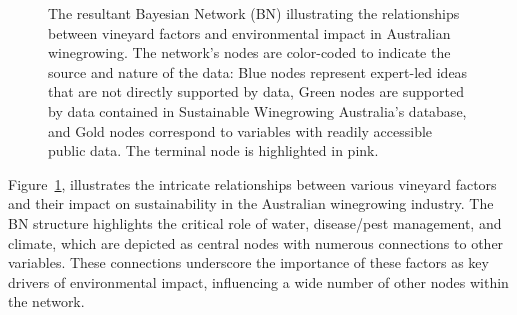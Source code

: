 \documentclass[fleqn,10pt]{wlscirep}
\begin{document}

% 
\begin{figure}[h!]
    \centering
    \caption{The resultant Bayesian Network (BN) illustrating the relationships between vineyard factors and environmental impact in Australian winegrowing. The network's nodes are color-coded to indicate the source and nature of the data: Blue nodes represent expert-led ideas that are not directly supported by data, Green nodes are supported by data contained in Sustainable Winegrowing Australia's database, and Gold nodes correspond to variables with readily accessible public data. The terminal node is highlighted in pink.}\label{fig:generalBN}
\end{figure}


Figure~\ref{fig:generalBN}, illustrates the intricate relationships between various vineyard factors and their impact on sustainability in the Australian winegrowing industry. The BN structure highlights the critical role of water, disease/pest management, and climate, which are depicted as central nodes with numerous connections to other variables. These connections underscore the importance of these factors as key drivers of environmental impact, influencing a wide number of other nodes within the network.
\end{document}
